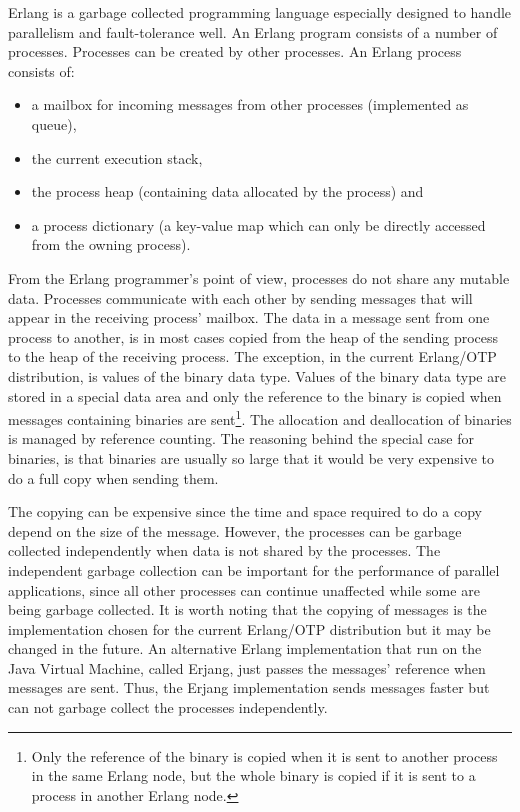 \documentclass[aps,pre,preprint,nofootinbib]{revtex4}
\begin{document}
Erlang is a garbage collected programming language especially designed to handle parallelism and fault-tolerance well.
An Erlang program consists of a number of processes.
Processes can be created by other processes.
An Erlang process consists of: 
\begin{itemize}
 \item a mailbox for incoming messages from other processes (implemented as queue),
 \item the current execution stack,
 \item the process heap (containing data allocated by the process) and
 \item a process dictionary (a key-value map which can only be directly accessed from the owning process).
\end{itemize}
From the Erlang programmer's point of view, processes do not share any mutable data.
Processes communicate with each other by sending messages that will appear in the receiving process' mailbox.
The data in a message sent from one process to another, is in most cases copied from the heap of the sending process to the heap of the receiving process.
The exception, in the current Erlang/OTP distribution, is values of the binary data type.
Values of the binary data type are stored in a special data area and only the reference to the binary is copied when messages containing binaries are sent\footnote{Only the reference of the binary is copied when it is sent to another process in the same Erlang node, but the whole binary is copied if it is sent to a process in another Erlang node.}.
The allocation and deallocation of binaries is managed by reference counting.
The reasoning behind the special case for binaries, is that binaries are usually so large that it would be very expensive to do a full copy when sending them.

The copying can be expensive since the time and space required to do a copy depend on the size of the message.
However, the processes can be garbage collected independently when data is not shared by the processes.
The independent garbage collection can be important for the performance of parallel applications, since all other processes can continue unaffected while some are being garbage collected.
It is worth noting that the copying of messages is the implementation chosen for the current Erlang/OTP distribution but it may be changed in the future.
An alternative Erlang implementation that run on the Java Virtual Machine, called Erjang, just passes the messages' reference when messages are sent.
Thus, the Erjang implementation sends messages faster but can not garbage collect the processes independently.
\end{document}
